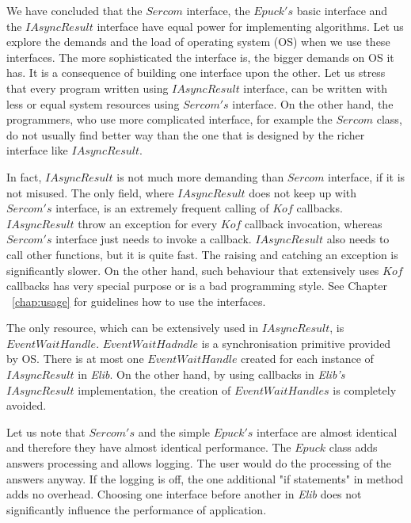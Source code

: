   We have concluded that the $Sercom$ interface, the $Epuck's$ basic interface and 
  the $IAsyncResult$ interface have equal power for implementing algorithms.
  Let us explore the demands and the load of operating system (OS) when we use these interfaces.
  The more sophisticated the interface is, the bigger demands on OS it has.
  It is a consequence of building one interface upon the other.
  Let us stress that every program written using $IAsyncResult$ interface, 
  can be written with less or equal system resources using $Sercom's$
  interface. On the other hand, the programmers, 
  who use more complicated interface, for example the $Sercom$ class, do not usually find better way 
  than the one that is designed by the richer interface like $IAsyncResult$.

  In fact, $IAsyncResult$ is not much more demanding than $Sercom$ interface, if it is not misused.
  The only field, where $IAsyncResult$ does not keep up with $Sercom's$ interface, 
  is an extremely frequent calling of $Kof$ callbacks.
  $IAsyncResult$ throw an exception for every $Kof$ callback invocation, 
  whereas $Sercom's$ interface just needs to invoke a callback.
  $IAsyncResult$ also needs to call other functions, but it is quite fast. 
  The raising and catching an exception is significantly slower.
  On the other hand, such behaviour that extensively uses $Kof$ callbacks 
  has very special purpose or is a bad programming style.
  See Chapter ~\ref{chap:usage} for guidelines how to use the interfaces.

  The only resource, which can be extensively used in $IAsyncResult$, is $EventWaitHandle$. 
  $EventWaitHadndle$ is a synchronisation primitive provided
  by OS. There is at most one $EventWaitHandle$ created for each instance of $IAsyncResult$ in {\it Elib}. 
  On the other hand, by using callbacks in {\it Elib's} $IAsyncResult$
  implementation, the creation of $EventWaitHandles$ is completely avoided.

  Let us note that $Sercom's$ and the simple $Epuck's$ interface 
  are almost identical and therefore they have almost identical performance.
  The $Epuck$ class adds answers processing and allows logging. The user would do the processing of the answers anyway.
  If the logging is off, the one additional "if statements" in method adds no overhead. 
  Choosing one interface before another in {\it Elib} does not significantly influence the performance of application.

